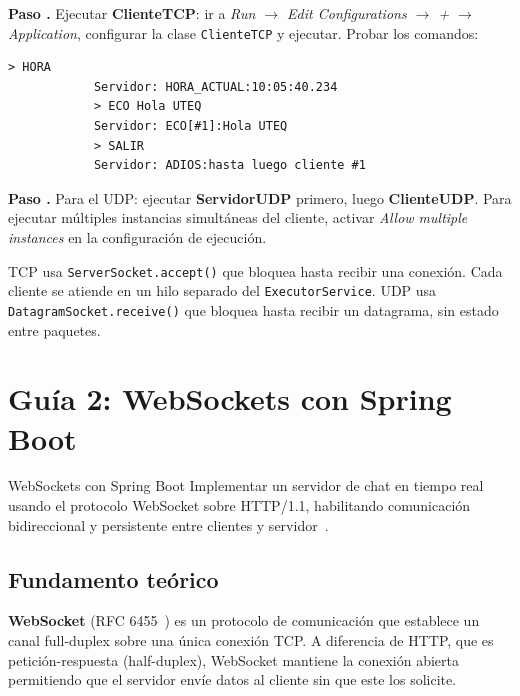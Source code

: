 \documentclass[12pt, a4paper, openany]{book}
\newcounter{paso}[section]
\newcommand{\resetpasos}{\setcounter{paso}{0}}
\newcommand{\paso}[1]{%
	\stepcounter{paso}%
	\medskip\noindent
	\begin{tcolorbox}[enhanced, colback=white, colframe=practiceBlue,
		boxrule=0.8pt, arc=3pt, left=6pt, right=6pt, top=4pt, bottom=4pt,
		before upper={\noindent}]
		\textcolor{practiceBlue}{\textbf{Paso \arabic{paso}.}} #1
	\end{tcolorbox}%
}
\newcommand{\code}[1]{\texttt{\small#1}}
\newcommand{\menu}[1]{\textit{#1}}
\begin{document}
	\paso{Ejecutar \textbf{ClienteTCP}: ir a \menu{Run $\to$ Edit Configurations
			$\to$ + $\to$ Application}, configurar la clase \code{ClienteTCP} y ejecutar.
		Probar los comandos:}
	
	\begin{resultadobox}
		\begin{lstlisting}[style=BashStyle]
			> HORA
			Servidor: HORA_ACTUAL:10:05:40.234
			> ECO Hola UTEQ
			Servidor: ECO[#1]:Hola UTEQ
			> SALIR
			Servidor: ADIOS:hasta luego cliente #1
		\end{lstlisting}
	\end{resultadobox}
	
	\paso{Para el UDP: ejecutar \textbf{ServidorUDP} primero, luego
		\textbf{ClienteUDP}. Para ejecutar múltiples instancias simultáneas del cliente,
		activar \menu{Allow multiple instances} en la configuración de ejecución.}
	
	\begin{notabox}
		TCP usa \code{ServerSocket.accept()} que bloquea hasta recibir una conexión.
		Cada cliente se atiende en un hilo separado del \code{ExecutorService}.
		UDP usa \code{DatagramSocket.receive()} que bloquea hasta recibir un datagrama,
		sin estado entre paquetes.
	\end{notabox}
	
	\chapter{Guía 2: WebSockets con Spring Boot}
	\resetpasos
	
	\begin{objetivobox}{WebSockets con Spring Boot}
		Implementar un servidor de chat en tiempo real usando el protocolo WebSocket
		sobre HTTP/1.1, habilitando comunicación bidireccional y persistente entre
		clientes y servidor~\parencite{fette2011}.
	\end{objetivobox}
	
	\section{Fundamento teórico}
	
	\textbf{WebSocket} (RFC 6455~\parencite{fette2011}) es un protocolo de comunicación
	que establece un canal full-duplex sobre una única conexión TCP. A diferencia de
	HTTP, que es petición-respuesta (half-duplex), WebSocket mantiene la conexión
	abierta permitiendo que el servidor envíe datos al cliente sin que este los solicite.
	
\end{document}
